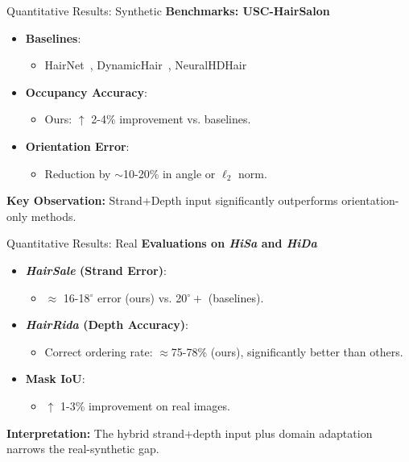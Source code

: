\begin{frame}[t]{Quantitative Results: Synthetic}
    \textbf{Benchmarks: USC-HairSalon}
    \begin{itemize}
        \item \textbf{Baselines}:
        \begin{itemize}
            \item HairNet~\cite{zhou2018hairnet}, DynamicHair~\cite{yang2019dynamic}, NeuralHDHair~\cite{wu2022neuralhdhair}
        \end{itemize}
        \item \textbf{Occupancy Accuracy}:
        \begin{itemize}
            \item Ours: \(\uparrow\) 2-4\% improvement vs. baselines.
        \end{itemize}
        \item \textbf{Orientation Error}:
        \begin{itemize}
            \item Reduction by \(\sim\)10-20\% in angle or $\ell_2$ norm.
        \end{itemize}
    \end{itemize}
    \vspace{5pt}
    \textbf{Key Observation:} Strand+Depth input significantly outperforms orientation-only methods.
\end{frame}

\begin{frame}[t]{Quantitative Results: Real}
    \textbf{Evaluations on \emph{HiSa} and \emph{HiDa}}
    \begin{itemize}
        \item \textbf{\emph{HairSale} (Strand Error)}:
        \begin{itemize}
            \item $\approx$ 16-18$^\circ$ error (ours) vs. 20$^\circ+$ (baselines).
        \end{itemize}
        \item \textbf{\emph{HairRida} (Depth Accuracy)}:
        \begin{itemize}
            \item Correct ordering rate: $\approx$75-78\% (ours), significantly better than others.
        \end{itemize}
        \item \textbf{Mask IoU}: 
        \begin{itemize}
            \item $\uparrow$ 1-3\% improvement on real images.
        \end{itemize}
    \end{itemize}
    \vspace{5pt}
    \textbf{Interpretation:} The hybrid strand+depth input plus domain adaptation narrows the real-synthetic gap.
\end{frame}

